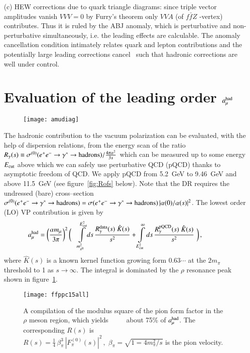 \documentclass[epj,onecolumn]{webofc}
\newcommand{\mbo}[1]{$#1$ }
\newcommand{\amuh}{a_\mu^{\rm had} }
\newcommand{\bea}{\begin{eqnarray}}
\newcommand{\eea}{\end{eqnarray}}
\begin{document}
(c) HEW corrections due to quark triangle diagrams: since triple
vector amplitudes vanish $VVV = 0$ by Furry's theorem only $VVA$ (of
\mbo{f\bar{f}Z}-vertex) contributes. Thus it is ruled by the ABJ
anomaly, which is perturbative and non-perturbative simultaneously,
i.e. the leading effects are calculable. The anomaly cancellation condition
intimately relates quark and lepton contributions and the
potentially large leading corrections cancel~\cite{KPPdeR02,MV03,CMV03}
such that hadronic corrections are well under control.

\section{Evaluation of the leading order $a_\mu^{\rm had}$}
\begin{wrapfigure}{l}[3pt]{2.6cm}
\texttt{[image: amudiag]}
\end{wrapfigure}
The hadronic contribution to the vacuum polarization can be evaluated,
with the help of dispersion relations, from the energy scan of the
ratio $R_{\gamma}(s)\equiv \sigma^{(0)}(e^+e^-\to \gamma^*\to {\rm
hadrons}) /\frac{4\pi\alpha^2}{3s}$ which can be measured up to some
energy $E_{\rm cut}$ above which we can safely use perturbative QCD
(pQCD) thanks to asymptotic freedom of QCD. We apply pQCD from 5.2~GeV
to 9.46~GeV and above 11.5~GeV (see figure~\ref{fig:Rofs} below). Note that the DR requires the
undressed (bare) cross--section $\sigma^{(0)}(e^+e^-\to \gamma^*\to {\rm
hadrons})=\sigma(e^+e^-\to \gamma^*\to {\rm
hadrons})\,|\alpha(0)/\alpha(s)|^2$. The lowest order (LO) VP
contribution is given by
\bea
\amuh = \left(\frac{\alpha m_\mu}{3\pi}
\right)^2 \bigg(\;\;\;
\int\limits_{m_{\pi^0}^2}^{E^2_{\rm cut}}ds\,
\frac{{ R^{\mathrm{data}}_\gamma(s)}\;\hat{K}(s)}{s^2}
+ \int\limits_{E^2_{\rm cut}}^{\infty}ds\,
\frac{{R^{\mathrm{pQCD}}_\gamma(s)}\;\hat{K}(s)}{s^2}\,\,
\bigg)\,,~~~~~~~~~~~~~
\label{amuDRbasic}
\eea
where $\hat{K}(s)$ is a known kernel function growing form $0.63\cdots$ at the
$2m_\pi$ threshold to 1 as $s\to \infty$. The integral is dominated by
the $\rho$ resonance peak shown in figure~\ref{fig:VPdiadata}.
\begin{figure}[h]
\vspace*{-6mm}
\centering
\texttt{[image: ffppc15all]}
\caption{A compilation of the modulus square of the pion form factor in the $\rho$ meson region,
which yields ~~~~ about 75\% of $\amuh$. The corresponding $R(s)$ is
$R(s)=\frac14\,\beta_\pi^3\,|F_\pi^{(0)}(s)|^2\,,\,\,\beta_\pi=\sqrt{1=4m^2_\pi/s}$
is the pion velocity.}
\label{fig:VPdiadata}
\end{figure}
\end{document}
